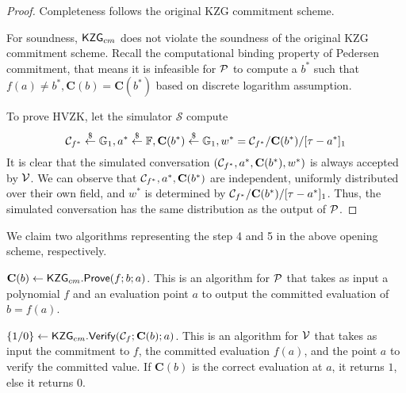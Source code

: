 \begin{proof}
Completeness follows the original KZG commitment scheme.

For soundness, $\mathsf{KZG}_{cm}$ does not violate the soundness of the original KZG commitment scheme. Recall the computational binding property of Pedersen commitment, that means it is infeasible for $\mathcal{P}$ to compute a $b^*$ such that $f(a)\ne{b^*},\textbf{C}(b)=\textbf{C}(b^*)$ based on discrete logarithm assumption.

To prove HVZK, let the simulator $\mathcal{S}$ compute
$$
\mathcal{C}_{f^*}\stackrel{\$}{\leftarrow}\mathbb{G}_1,a^*\stackrel{\$}{\leftarrow}\mathbb{F},\textbf{C}(b^*)\stackrel{\$}{\leftarrow}\mathbb{G}_1,w^*=\mathcal{C}_{f^*}/\textbf{C}(b^*)/[\tau-a^*]_1
$$
It is clear that the simulated conversation $(\mathcal{C}_{f^*},a^*,\textbf{C}(b^*),w^*)$  is always accepted by $\mathcal{V}$. We can observe that $\mathcal{C}_{f^*},a^*,\textbf{C}(b^*)$ are independent, uniformly distributed over their own field, and $w^*$ is determined by $\mathcal{C}_{f^*}/\textbf{C}(b^*)/[\tau-a^*]_1$. Thus, the simulated conversation has the same distribution as the output of $\mathcal{P}$.
\end{proof}

We claim two algorithms representing the step 4 and 5 in the above opening scheme, respectively.
\begin{claim}
$\textbf{C}(b)\leftarrow\mathsf{KZG}_{cm}.\mathsf{Prove}(f;b;a)$. This is an algorithm for $\mathcal{P}$ that takes as input a polynomial $f$ and an evaluation point $a$ to output the committed evaluation of $b=f(a)$.
\end{claim}

\begin{claim}
$\{1/0\}\leftarrow\mathsf{KZG}_{cm}.\mathsf{Verify}(\mathcal{C}_f;\textbf{C}(b);a)$. This is an algorithm for $\mathcal{V}$ that takes as input the commitment to $f$, the committed evaluation $f(a)$, and the point $a$ to verify the committed value. If $\textbf{C}(b)$ is the correct evaluation at $a$, it returns $1$, else it returns $0$.
\end{claim}
